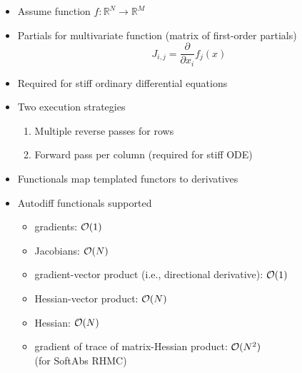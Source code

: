 \documentclass[10pt]{report}
\begin{document}
%
\begin{itemize}
\item Assume function $f:\mathbb{R}^N \rightarrow \mathbb{R}^M$
\item Partials for multivariate function (matrix of first-order partials)
\[
J_{i,j} = \frac{\partial}{\partial x_i} f_j(x)
\]
\item Required for stiff ordinary differential equations
\item Two execution strategies
{\small
\begin{enumerate}
  \item Multiple reverse passes for rows
  \item Forward pass per column (required for stiff ODE)
\end{enumerate}
}
%
%
\end{itemize}


%
\begin{itemize}
\item Functionals map templated functors to derivatives
\item Autodiff functionals supported
  \begin{itemize}\small
  \item gradients: ${\mathcal{O}}(1)$
  \item Jacobians: ${\mathcal{O}}(N)$
  \item gradient-vector product (i.e., directional derivative): ${\mathcal{O}}(1)$
  \item Hessian-vector product: ${\mathcal{O}}(N)$
  \item Hessian: ${\mathcal{O}}(N)$
  \item gradient of trace of matrix-Hessian product: ${\mathcal{O}}(N^2)$
    \\ {\footnotesize (for SoftAbs RHMC)}
  \end{itemize}
\end{itemize}
\end{document}
